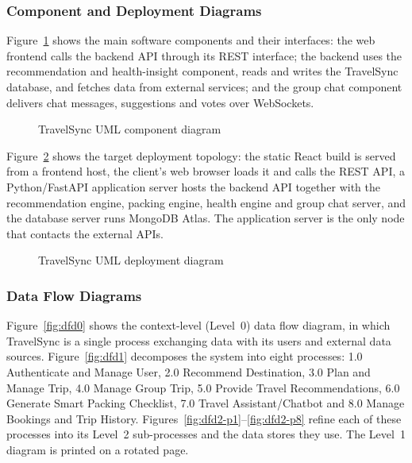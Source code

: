 \subsubsection{Component and Deployment Diagrams}

Figure~\ref{fig:component} shows the main software components and their
interfaces: the web frontend calls the backend API through its REST
interface; the backend uses the recommendation and health-insight
component, reads and writes the TravelSync database, and fetches data from
external services; and the group chat component delivers chat messages,
suggestions and votes over WebSockets.

\begin{figure}[htbp]
  \centering
  \caption{TravelSync UML component diagram}
  \label{fig:component}
\end{figure}

Figure~\ref{fig:deployment} shows the target deployment topology: the
static React build is served from a frontend host, the client's web browser
loads it and calls the REST API, a Python/FastAPI application server hosts
the backend API together with the recommendation engine, packing engine,
health engine and group chat server, and the database server runs MongoDB
Atlas. The application server is the only node that contacts the external
APIs.

\begin{figure}[htbp]
  \centering
  \caption{TravelSync UML deployment diagram}
  \label{fig:deployment}
\end{figure}

\subsubsection{Data Flow Diagrams}

Figure~\ref{fig:dfd0} shows the context-level (Level~0) data flow diagram, in
which TravelSync is a single process exchanging data with its users and
external data sources. Figure~\ref{fig:dfd1} decomposes the system into eight
processes: 1.0 Authenticate and Manage User, 2.0 Recommend Destination,
3.0 Plan and Manage Trip, 4.0 Manage Group Trip, 5.0 Provide Travel
Recommendations, 6.0 Generate Smart Packing Checklist, 7.0 Travel
Assistant/Chatbot and 8.0 Manage Bookings and Trip History.
Figures~\ref{fig:dfd2-p1}--\ref{fig:dfd2-p8} refine each of these processes
into its Level~2 sub-processes and the data stores they use. The Level~1
diagram is printed on a rotated page.

